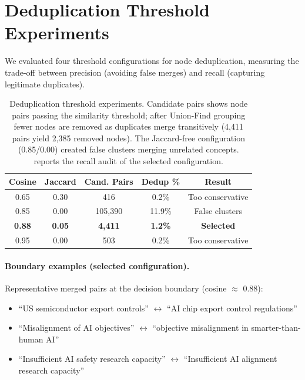 \documentclass[10pt,twocolumn,letterpaper]{article}
\begin{document}
\section{Deduplication Threshold Experiments}
\label{app:dedup}

We evaluated four threshold configurations for node deduplication, measuring the
trade-off between precision (avoiding false merges) and recall (capturing
legitimate duplicates).

\begin{table}[h]
\centering
\small
\begin{tabular}{ccccc}
\toprule
\textbf{Cosine} & \textbf{Jaccard} & \textbf{Cand. Pairs} & \textbf{Dedup \%} & \textbf{Result} \\
\midrule
0.65 & 0.30 & 416 & 0.2\% & Too conservative \\
0.85 & 0.00 & 105,390 & 11.9\% & False clusters \\
\textbf{0.88} & \textbf{0.05} & \textbf{4,411} & \textbf{1.2\%} & \textbf{Selected} \\
0.95 & 0.00 & 503 & 0.2\% & Too conservative \\
\bottomrule
\end{tabular}
\caption{Deduplication threshold experiments. Candidate pairs shows node pairs
passing the similarity threshold; after Union-Find grouping fewer nodes are
removed as duplicates merge transitively (4{,}411 pairs yield 2{,}385 removed
nodes). The Jaccard-free configuration (0.85/0.00) created false clusters merging
unrelated concepts.  reports the recall audit of the selected
configuration.}
\label{tab:dedup-thresholds}
\end{table}

\paragraph{Boundary examples (selected configuration).}
Representative merged pairs at the decision boundary (cosine $\approx$ 0.88):
\begin{itemize}
\setlength{\itemsep}{0pt}
\item ``US semiconductor export controls'' $\leftrightarrow$ ``AI chip export control regulations''
\item ``Misalignment of AI objectives'' $\leftrightarrow$ ``objective misalignment in smarter-than-human AI''
\item ``Insufficient AI safety research capacity'' $\leftrightarrow$ ``Insufficient AI alignment research capacity''
\end{itemize}
\end{document}

